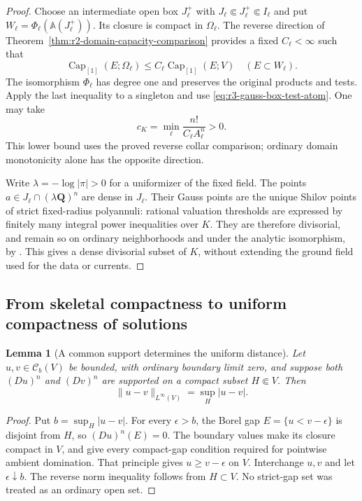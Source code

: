 \documentclass[11pt,a4paper]{article}
\numberwithin{equation}{section}
\newtheorem{lemma}[theorem]{Lemma}
\theoremstyle{definition}
\theoremstyle{remark}
\newcommand{\Cb}{\mathcal C_b}
\begin{document}
\begin{proof}
Choose an intermediate open box $J_\ell^+$ with
$J_\ell\Subset J_\ell^+\Subset I_\ell$ and put
$W_\ell=\Phi_\ell(\mathbb A(J_\ell^+))$.
Its closure is compact in $\Omega_\ell$. The reverse
direction of Theorem~\ref{thm:r2-domain-capacity-comparison}
provides a fixed $C_\ell<\infty$ such that
\[
 \operatorname{Cap}_{[1]}(E;\Omega_\ell)
       \leq C_\ell\operatorname{Cap}_{[1]}(E;V)
                                  \quad(E\subset W_\ell).
\]
The isomorphism $\Phi_\ell$ has degree one and preserves
the original products and tests. Apply the last inequality
to a singleton and use \eqref{eq:r3-gauss-box-test-atom}.
One may take
\[
 c_K=\min_\ell\frac{n!}{C_\ell A_\ell^n}>0.
\]
This lower bound uses the proved reverse collar comparison;
ordinary domain monotonicity alone has the opposite direction.

Write $\lambda=-\log|\pi|>0$ for a uniformizer of the fixed
field. The points $a\in J_\ell\cap(\lambda\mathbf Q)^n$
are dense in $J_\ell$. Their Gauss points are the unique
Shilov points of strict fixed-radius polyannuli: rational
valuation thresholds are expressed by finitely many integral
power inequalities over $K$. They are therefore divisorial,
and remain so on ordinary neighborhoods and under the analytic
isomorphism, by \cite[Proposition~A.3 and Corollary~A.6]{GM19}.
This gives a dense divisorial subset of $K$, without extending
the ground field used for the data or currents.
\end{proof}

\subsection{From skeletal compactness to uniform compactness of solutions}

\begin{lemma}[A common support determines the uniform distance]
\label{lem:r3-support-uniform-isometry}
Let $u,v\in\Cb(V)$ be bounded, with ordinary boundary limit
zero, and suppose both $(Du)^n$ and $(Dv)^n$ are supported
on a compact subset $H\Subset V$. Then
\[
 \|u-v\|_{L^\infty(V)}=\sup_H|u-v|.
\]
\end{lemma}

\begin{proof}
Put $b=\sup_H|u-v|$. For every $\epsilon>b$, the Borel gap
$E=\{u<v-\epsilon\}$ is disjoint from $H$, so
$(Du)^n(E)=0$. The boundary values make its closure compact
in $V$, and give every compact-gap condition required for
pointwise ambient domination. That principle gives
$u\geq v-\epsilon$ on $V$. Interchange $u,v$ and let
$\epsilon\downarrow b$. The reverse norm inequality follows
from $H\subset V$. No strict-gap set was treated as an
ordinary open set.
\end{proof}
\end{document}

